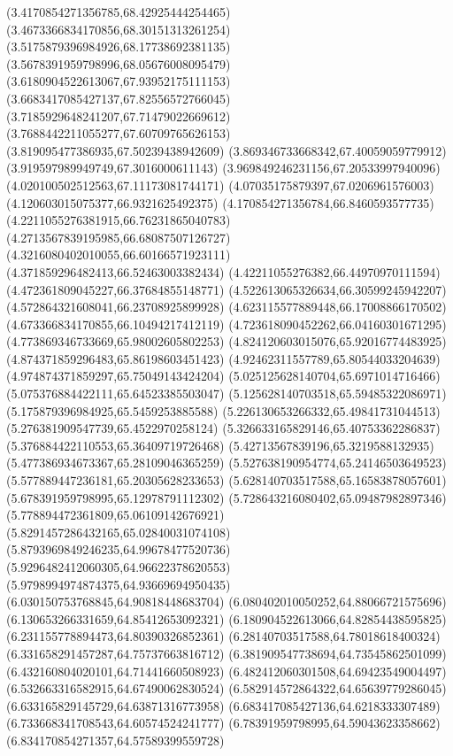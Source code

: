 {(3.4170854271356785,68.42925444254465)
(3.4673366834170856,68.30151313261254)
(3.5175879396984926,68.17738692381135)
(3.5678391959798996,68.05676008095479)
(3.6180904522613067,67.93952175111153)
(3.6683417085427137,67.82556572766045)
(3.7185929648241207,67.71479022669612)
(3.7688442211055277,67.60709765626153)
(3.819095477386935,67.50239438942609)
(3.869346733668342,67.40059059779912)
(3.919597989949749,67.3016000611143)
(3.969849246231156,67.20533997940096)
(4.020100502512563,67.11173081744171)
(4.07035175879397,67.0206961576003)
(4.120603015075377,66.9321625492375)
(4.170854271356784,66.8460593577735)
(4.2211055276381915,66.76231865040783)
(4.2713567839195985,66.68087507126727)
(4.3216080402010055,66.60166571923111)
(4.371859296482413,66.52463003382434)
(4.42211055276382,66.44970970111594)
(4.472361809045227,66.37684855148771)
(4.522613065326634,66.30599245942207)
(4.572864321608041,66.23708925899928)
(4.623115577889448,66.17008866170502)
(4.673366834170855,66.10494217412119)
(4.723618090452262,66.04160301671295)
(4.773869346733669,65.98002605802253)
(4.824120603015076,65.92016774483925)
(4.874371859296483,65.86198603451423)
(4.92462311557789,65.80544033204639)
(4.974874371859297,65.75049143424204)
(5.025125628140704,65.6971014716466)
(5.075376884422111,65.64523385503047)
(5.125628140703518,65.59485322086971)
(5.175879396984925,65.5459253885588)
(5.226130653266332,65.49841731044513)
(5.276381909547739,65.4522970258124)
(5.326633165829146,65.40753362286837)
(5.376884422110553,65.36409719726468)
(5.42713567839196,65.3219588132935)
(5.477386934673367,65.28109046365259)
(5.527638190954774,65.24146503649523)
(5.577889447236181,65.20305628233653)
(5.628140703517588,65.16583878057601)
(5.678391959798995,65.12978791112302)
(5.728643216080402,65.09487982897346)
(5.778894472361809,65.06109142676921)
(5.8291457286432165,65.02840031074108)
(5.8793969849246235,64.99678477520736)
(5.9296482412060305,64.96622378620553)
(5.9798994974874375,64.93669694950435)
(6.030150753768845,64.90818448683704)
(6.080402010050252,64.88066721575696)
(6.130653266331659,64.85412653092321)
(6.180904522613066,64.82854438595825)
(6.231155778894473,64.80390326852361)
(6.28140703517588,64.78018618400324)
(6.331658291457287,64.75737663816712)
(6.381909547738694,64.73545862501099)
(6.432160804020101,64.71441660508923)
(6.482412060301508,64.69423549004497)
(6.532663316582915,64.67490062830524)
(6.582914572864322,64.65639779286045)
(6.633165829145729,64.63871316773958)
(6.683417085427136,64.6218333307489)
(6.733668341708543,64.60574524241777)
(6.78391959798995,64.59043623358662)
(6.834170854271357,64.57589399559728)
}
